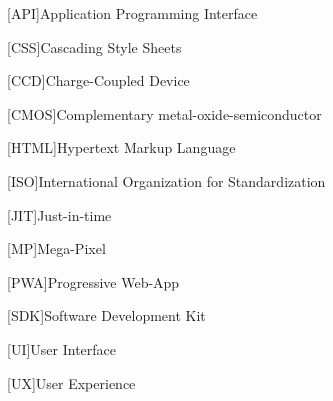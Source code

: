 \begin{acronym}[AAAAA]

[API]{Application Programming Interface}

[CSS]{Cascading Style Sheets}

[CCD]{Charge-Coupled Device}

[CMOS]{Complementary metal-oxide-semiconductor}

[HTML]{Hypertext Markup Language}

[ISO]{International Organization for Standardization}

[JIT]{Just-in-time}

[MP]{Mega-Pixel}

[PWA]{Progressive Web-App}

[SDK]{Software Development Kit}

[UI]{User Interface}

[UX]{User Experience}

\end{acronym}